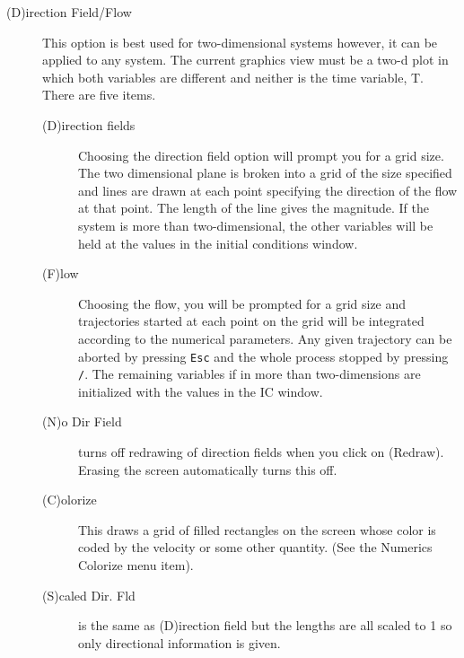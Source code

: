 \documentclass{article}
\newcommand{\tc}[1]{\addcontentsline{toc}{subsection}{#1}}
\begin{document}
\begin{description}
\begin{description}
\end{description}
\tc{Direction Field/Flow}\item[(D)irection Field/Flow]
This option is best used for two-dimensional systems however,
 it can be applied to any system.  The current graphics view must be a
 two-d plot in which both variables are different and neither is the time
 variable, T.  There are five items.
\begin{description}
\item[(D)irection fields] Choosing the direction field option will prompt you for 
a grid size.  The two dimensional plane is broken into a grid of the size
 specified and lines are drawn at each point specifying the direction of 
the flow at that point. The length of the line gives the 
magnitude. If the system is more than two-dimensional, the
 other variables will be held at the values in the initial conditions
window.
\item[(F)low] Choosing the flow, you will be prompted for a grid size
and
 trajectories
 started at each point on the grid will be integrated according to the
 numerical parameters.  Any given trajectory can be aborted by pressing 
{\tt Esc} and the whole process stopped by pressing {\tt /}.  The
remaining
 variables 
if in more than two-dimensions are initialized with the values in the
IC window. 
\item[(N)o Dir Field] turns off redrawing of direction fields when you
click on (Redraw).  Erasing the screen automatically turns this off.
\item[(C)olorize] This draws a grid of filled rectangles on the screen
whose color is coded by the velocity or some other quantity. (See the
Numerics Colorize menu item).
\item[(S)caled Dir. Fld] is the same as (D)irection field but the
lengths are all scaled to 1 so only directional information is given.
\end{description}



\end{description}
\end{document}
